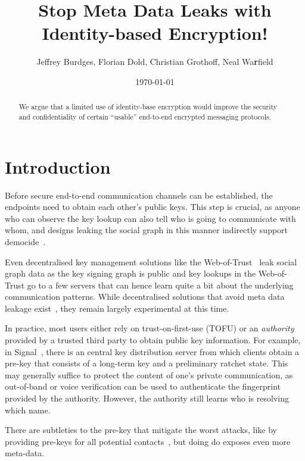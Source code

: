 \documentclass[twoside,letterpaper]{sig-alternate}
\title{Stop Meta Data Leaks with Identity-based Encryption!} %
\author{Jeffrey Burdges, Florian Dold, Christian Grothoff, Neal Wa{\bf r}field}
\date{\today}
\begin{document}
\maketitle


\begin{abstract}
We argue that a limited use of identity-base encryption would improve
the security and confidentiality of certain ``usable'' end-to-end
encrypted messaging protocols.
\end{abstract}

\section{Introduction}

Before secure end-to-end communication channels can be established,
the endpoints need to obtain each other's public keys.  This step is
crucial, as anyone who can observe the key lookup can also tell who is
going to communicate with whom, and designs leaking the social graph
in this manner indirectly support democide~\cite{skynet}.

Even decentralised key management solutions like the
Web-of-Trust~\cite{wot} leak social graph data as the key signing
graph is public and key lookups in the Web-of-Trust go to a few
servers that can hence learn quite a bit about the underlying
communication patterns.  While decentralised solutions that avoid meta
data leakage exist~\cite{gns}, they remain largely experimental at
this time.

In practice, most users either rely on trust-on-first-use (TOFU) or an
{\em authority} provided by a trusted third party to obtain public key
information.  For example, in Signal~\cite{TextSecure}, there is an
central key distribution server from which clients obtain a pre-key
that consists of a long-term key and a preliminary ratchet state.
This may generally suffice to protect the content of one's private
communication, as out-of-band or voice verification can be used to
authenticate the fingerprint provided by the authority.
However, the authority still learns who is resolving which
name.

There are subtleties to the pre-key that mitigate the worst attacks,
like by providing pre-keys for all potential
contacts~\cite[\S4.3]{TextSecure}, but doing do exposes even more
meta-data.
\end{document}

